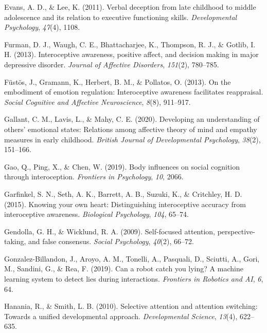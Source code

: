 \documentclass[
  man,mask,floatsintext]{apa6}
\newlength{\cslhangindent}
\newlength{\cslentryspacingunit} %
\newenvironment{CSLReferences}[2] %
 {%
  \setlength{\parindent}{0pt}
  \ifodd #1
  \let\oldpar\par
  \def\par{\hangindent=\cslhangindent\oldpar}
  \fi
  \setlength{\parskip}{#2\cslentryspacingunit}
 }%
 {}
\begin{document}
\begin{CSLReferences}{1}{0}
\leavevmode{}%
Evans, A. D., \& Lee, K. (2011). Verbal deception from late childhood to middle adolescence and its relation to executive functioning skills. \emph{Developmental Psychology}, \emph{47}(4), 1108.

\leavevmode{}%
Furman, D. J., Waugh, C. E., Bhattacharjee, K., Thompson, R. J., \& Gotlib, I. H. (2013). Interoceptive awareness, positive affect, and decision making in major depressive disorder. \emph{Journal of Affective Disorders}, \emph{151}(2), 780--785.

\leavevmode{}%
Füstös, J., Gramann, K., Herbert, B. M., \& Pollatos, O. (2013). On the embodiment of emotion regulation: Interoceptive awareness facilitates reappraisal. \emph{Social Cognitive and Affective Neuroscience}, \emph{8}(8), 911--917.

\leavevmode{}%
Gallant, C. M., Lavis, L., \& Mahy, C. E. (2020). Developing an understanding of others' emotional states: Relations among affective theory of mind and empathy measures in early childhood. \emph{British Journal of Developmental Psychology}, \emph{38}(2), 151--166.

\leavevmode{}%
Gao, Q., Ping, X., \& Chen, W. (2019). Body influences on social cognition through interoception. \emph{Frontiers in Psychology}, \emph{10}, 2066.

\leavevmode{}%
Garfinkel, S. N., Seth, A. K., Barrett, A. B., Suzuki, K., \& Critchley, H. D. (2015). Knowing your own heart: Distinguishing interoceptive accuracy from interoceptive awareness. \emph{Biological Psychology}, \emph{104}, 65--74.

\leavevmode{}%
Gendolla, G. H., \& Wicklund, R. A. (2009). Self-focused attention, perspective-taking, and false consensus. \emph{Social Psychology}, \emph{40}(2), 66--72.

\leavevmode{}%
Gonzalez-Billandon, J., Aroyo, A. M., Tonelli, A., Pasquali, D., Sciutti, A., Gori, M., Sandini, G., \& Rea, F. (2019). Can a robot catch you lying? A machine learning system to detect lies during interactions. \emph{Frontiers in Robotics and AI}, \emph{6}, 64.

\leavevmode{}%
Hanania, R., \& Smith, L. B. (2010). Selective attention and attention switching: Towards a unified developmental approach. \emph{Developmental Science}, \emph{13}(4), 622--635.


\end{CSLReferences}
\end{document}
